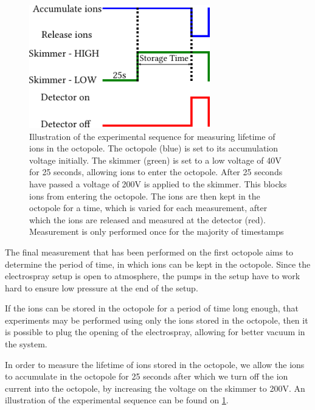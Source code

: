 \begin{figure}[h]
    \centering
    \includegraphics[width = 0.7\textwidth]{main/decayPulse.pdf}
    \caption{Illustration of the experimental sequence for measuring lifetime of ions in the octopole. The octopole (blue) is set to its accumulation voltage initially. The skimmer (green) is set to a low voltage of 40V for 25 seconds, allowing ions to enter the octopole. After 25 seconds have passed a voltage of 200V is applied to the skimmer. This blocks ions from entering the octopole.
    The ions are then kept in the octopole for a time, which is varied for each measurement, after which the ions are released and measured at the detector (red). Measurement is only performed once for the majority of timestamps}    
    \label{fig:decaySequence}
\end{figure}
The final measurement that has been performed on the first octopole aims to determine the period of time, in which ions can be kept in the octopole. Since the electrospray setup is open to atmosphere, the pumps in the setup have to work hard to ensure low pressure at the end of the setup.

If the ions can be stored in the octopole for a period of time long enough, that experiments may be performed using only the ions stored in the octopole, then it is possible to plug the opening of the electrospray, allowing for better vacuum in the system.

In order to measure the lifetime of ions stored in the octopole, we allow the ions to accumulate in the octopole for 25 seconds after which we turn off the ion current into the octopole, by increasing the voltage on the skimmer to 200V.
An illustration of the experimental sequence can be found on \cref{fig:decaySequence}.

